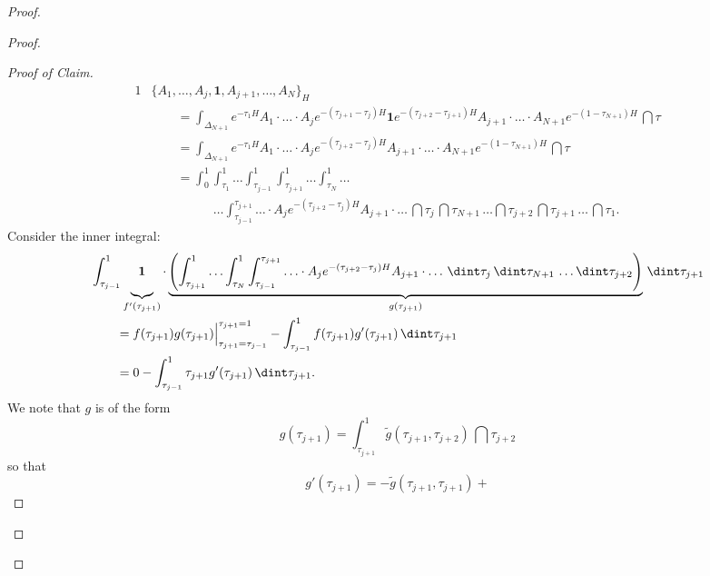 \documentclass[a4paper, english, 12pt, bibliography=totocnumbered,
index=totoc]{scrartcl}
\begin{document}
\begin{proof}
\begin{proof}
\begin{proof}[Proof of Claim]
			\begin{alignat*}{1}
				& \{A_1, \ldots, A_j, \mathbf{1}, A_{j+1}, \ldots, A_N\}_H \\
				& \qquad =
				\int_{\Delta_{N+1}} e^{-\tau_1 H}A_1
				\cdot \ldots \cdot A_j e^{-(\tau_{j+1} - \tau_j)H}
				\mathbf{1}
				e^{-(\tau_{j+2} - \tau_{j+1})H} A_{j+1} \cdot \ldots \cdot
				A_{N+1} e^{-(1 -
					\tau_{N+1})H} \, \dint \tau \\
				& \qquad =
				\int_{\Delta_{N+1}} e^{-\tau_1 H}A_1
				\cdot \ldots \cdot A_j
				e^{-(\tau_{j+2} - \tau_{j})H} A_{j+1} \cdot \ldots \cdot
				A_{N+1}
				e^{-(1 - \tau_{N+1})H} \, \dint \tau \\
				& \qquad = \int_0^1 \int_{\tau_1}^{1} \ldots
				\int_{\tau_{j-1}}^{1}
				\int_{\tau_{j+1}}^{1} \ldots \int_{\tau_{N}}^{1} \ldots \\
				& \qquad ~~~~~~~~~~~~~ \ldots
				\int_{\tau_{j-1}}^{\tau_{j+1}} \ldots \cdot A_j
				e^{-(\tau_{j+2} - \tau_{j})H} A_{j+1} \cdot \ldots \, \dint
				\tau_j \, \dint \tau_{N+1} \, \ldots
				\dint \tau_{j+2} \, \dint \tau_{j+1} \, \ldots \, \dint
				\tau_1.
			\end{alignat*}
			\normalsize
			Consider the inner integral:
			\footnotesize
			\begin{align}\label{Inner integral simplified}
				& \int_{\tau_{j-1}}^{1}
				\underbrace{\vphantom{\left(\int_{\tau_j}^1\right)}\mathbf{1}}_
				{f'(\tau_{j+1})} \cdot \underbrace{\left(
					\int_{\tau_{j+1}}^{1} \ldots \int_{\tau_{N}}^{1}
					\int_{\tau_{j-1}}^{\tau_{j+1}} \ldots \cdot A_j
					e^{-(\tau_{j+2} - \tau_{j})H} A_{j+1} \cdot \ldots \,
					\dint
					\tau_j \, \dint \tau_{N+1} \, \ldots
					\dint \tau_{j+2} \right)}_{g(\tau_{j+1})} \, \dint
				\tau_{j+1}
				\notag \\
				& \qquad = f(\tau_{j+1})g(\tau_{j+1})\Big \vert_{\tau_{j+1} =
					\tau_{j-1}}^{\tau_{j+1} = 1} - \int_{\tau_{j-1}}^1
				f(\tau_{j+1}) g'(\tau_{j+1}) \, \dint \tau_{j+1} \notag \\
				& \qquad = 0 - \int_{\tau_{j-1}}^1 \tau_{j+1} g'(\tau_{j+1})
				\,
				\dint \tau_{j+1}.
			\end{align}
			\normalsize
			We note that $g$ is of the form
			\begin{equation*}
				g(\tau_{j+1}) = \int_{\tau_{j+1}}^1 \tilde{g}(\tau_{j+1},
				\tau_{j+2}) \, \dint
				\tau_{j+2}
			\end{equation*}
			so that
			\begin{equation*}
				g'(\tau_{j+1}) = -\tilde{g}(\tau_{j+1}, \tau_{j+1}) +

\end{equation*}
\end{proof}
\end{proof}
\end{proof}
\end{document}
